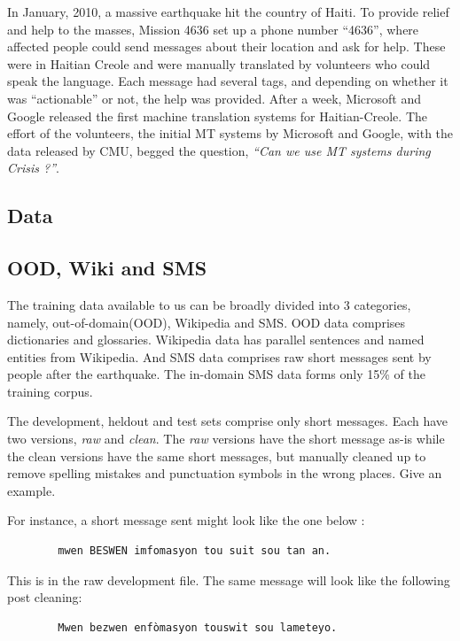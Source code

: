 In January, 2010, a massive earthquake hit the country of Haiti. To provide relief and help to the masses, Mission 4636 set up a phone number ``4636'', where affected people could send messages about their location and ask for help. These were in Haitian Creole and were manually translated by volunteers who could speak the language. Each message had several tags, and depending on whether it was ``actionable'' or not, the help was provided.  After a week, Microsoft and Google released the first machine translation systems for Haitian-Creole. The effort of the volunteers, the initial MT systems by Microsoft and Google, with the data released by CMU, begged the question, \emph{``Can we use MT systems during Crisis ?''}. 

\subsection{Data}
\label{sec:baseline_data}



\subsection{OOD, Wiki and SMS}
	The training data available to us can be broadly divided into 3 categories, namely, out-of-domain(OOD), Wikipedia and SMS. OOD data comprises dictionaries and glossaries. Wikipedia data has parallel sentences and named entities from Wikipedia. And SMS data comprises raw short messages sent by people after the earthquake. The in-domain SMS data forms only 15\% of the training corpus. 

	The development, heldout and test sets comprise only short messages. Each have two versions, \emph{raw} and \emph{clean}. The \emph{raw} versions have the short message as-is while the clean versions have the same short messages, but manually cleaned up to remove spelling mistakes and punctuation symbols in the wrong places. \alert{Give an example}. 

	For instance, a short message sent might look like the one below : 

	\begin{verbatim}
		mwen BESWEN imfomasyon tou suit sou tan an.
	\end{verbatim}

	This is in the raw development file. The same message will look like the following post cleaning:

	\begin{verbatim}
		Mwen bezwen enfòmasyon touswit sou lameteyo.
	\end{verbatim}

